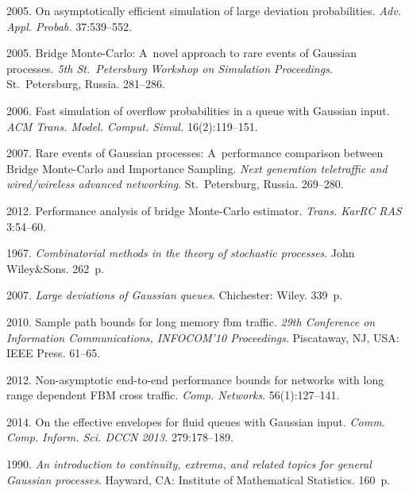 \begin{multicols}{2}
{{\begin{thebibliography}{99}
 2005.
On asymptotically efficient simulation of large deviation probabilities.
 \textit{Adv. Appl. Probab.} 37:539--552.

2005. Bridge Monte-Carlo: A~novel approach to rare events of Gaussian processes.
\textit{5th St.\ Petersburg Workshop on Simulation Proceedings}.
St.\ Petersburg, Russia. 281--286.

 2006. Fast simulation of overflow
probabilities in a queue with Gaussian input. \textit{ACM Trans. Model.
Comput. Simul.} 16(2):119--151.

2007. Rare events of Gaussian processes:
A~performance comparison between Bridge Monte-Carlo and Importance Sampling.
\textit{Next generation teletraffic and wired/wireless advanced networking}.
St.\ Petersburg, Russia. 269--280.

 2012.
Performance analysis of bridge Monte-Carlo estimator.
\textit{Trans. KarRC RAS} 3:54--60.

 1967. \textit{Combinatorial methods in the theory of stochastic processes}.
John Wiley\&Sons. 262~p.

 2007. \textit{Large deviations of Gaussian queues}.
Chichester: Wiley. 339~p.



 2010.
Sample path bounds for long memory fbm traffic.
\textit{29th Conference on Information Communications, INFOCOM'10 Proceedings}.
Piscataway, NJ, USA: IEEE Press. 61--65.

 2012.
Non-asymptotic end-to-end performance bounds
for networks with long range dependent FBM cross traffic. \textit{Comp. Networks}.
56(1):127--141.


  2014.
On the effective envelopes for fluid queues with Gaussian input.
\textit{Comm. Comp. Inform. Sci. DCCN 2013.} 279:178--189.

 1990. \textit{An introduction to continuity, extrema, and
related topics for general Gaussian processes}. Hayward, CA: Institute of
Mathematical Statistics. 160~p.


\end{thebibliography}}}
\end{multicols}
